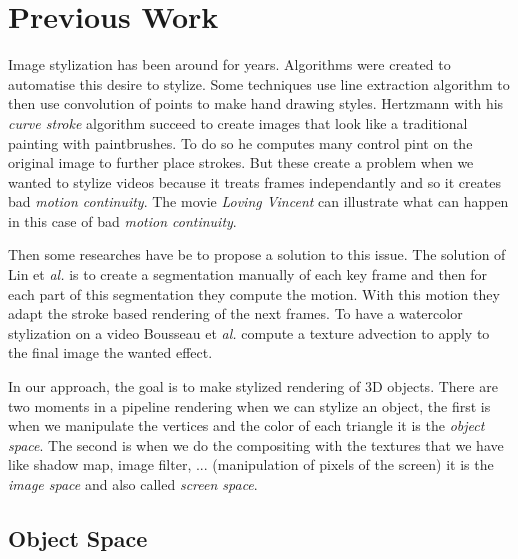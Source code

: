 \chapter{Previous Work}

Image stylization has been around for years. Algorithms were created to automatise this desire to stylize. Some techniques use line extraction algorithm to then use convolution of points to make hand drawing styles. Hertzmann with his \textit{curve stroke} algorithm \cite{rosin_stroke_2013}  succeed to create images that look like a traditional painting with paintbrushes. To do so he computes many control pint on the original image to further place strokes. But these create a problem when we wanted to stylize videos because it treats frames independantly and so it creates bad \textit{motion continuity}. The movie \textit{Loving Vincent}\cite{LovingVincent} can illustrate what can happen in this case of bad \textit{motion continuity}.

Then some researches have be to propose a solution to this issue\cite{litwinowicz_processing_1997, hays_image_2004, bousseau_video_2007, lin_video_nodate}. The solution of Lin et \textit{al.} \cite{lin_video_nodate} is to create a segmentation manually of each key frame and then for each part of this segmentation they compute the motion. With this motion they adapt the stroke based rendering of the next frames. To have a watercolor stylization on a video Bousseau et \textit{al.} compute a texture advection to apply to the final image the wanted effect.

In our approach, the goal is to make stylized rendering of 3D objects. There are two moments in a pipeline rendering when we can stylize an object, the first is when we manipulate the vertices and the color of each triangle it is the \textit{object space}. The second is when we do the compositing with the textures that we have like shadow map, image filter, ... (manipulation of pixels of the screen) it is the \textit{image space} and also called \textit{screen space}.

\section{Object Space}


